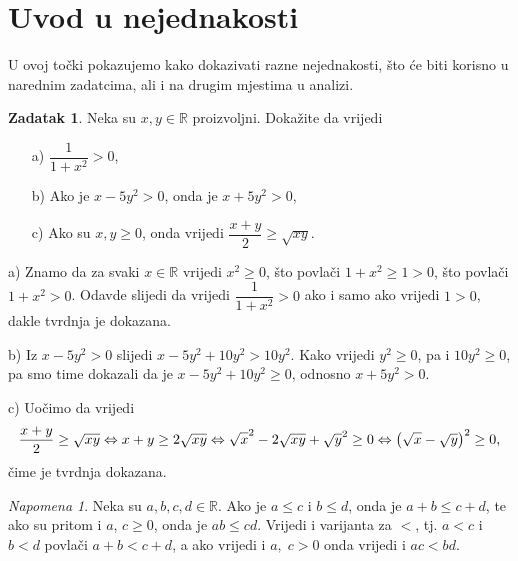 \documentclass{book}
\let\originalleft\left
\let\originalright\right
\renewcommand{\left}{\mathopen{}\mathclose\bgroup\originalleft}
\renewcommand{\right}{\aftergroup\egroup\originalright}
\renewenvironment{proof}{%
    \vspace{-\parskip}\begin{oldproof}%
    }{%
    \end{oldproof}%
}
\theoremstyle{definition}
\theoremstyle{definition}
\newtheorem{exercise}{Zadatak}
\theoremstyle{remark}
\newtheorem{remark}{Napomena}
\begin{document}
\section{Uvod u nejednakosti}
U ovoj točki pokazujemo kako dokazivati razne nejednakosti, što će biti korisno u narednim zadatcima, ali i na drugim mjestima u analizi.
\begin{exercise}
\label{25}
Neka su $x, y\in \mathbb{R}$ proizvoljni. Dokažite da vrijedi
\begin{itemize}
\item[a)] $\dfrac{1}{1+x^2}>0$,
\item[b)] Ako je $x-5y^2>0$, onda je $x+5y^2>0$,
\item[c)] Ako su $x, y\geq 0$, onda vrijedi $\dfrac{x+y}{2}\geq \sqrt{xy}$.
\end{itemize}
\end{exercise}
\begin{proof}[Rješenje]
a) Znamo da za svaki $x\in \mathbb{R}$ vrijedi $x^2\geq 0$, što povlači $1+x^2\geq 1>0$, što povlači $1+x^2>0$. Odavde slijedi da vrijedi $\dfrac{1}{1+x^2}>0$ ako i samo ako vrijedi $1>0$, dakle tvrdnja je dokazana.

b) Iz $x-5y^2>0$ slijedi $x-5y^2+10y^2>10y^2$. Kako vrijedi $y^2\geq 0$, pa i $10y^2\geq 0$, pa smo time dokazali da je $x-5y^2+10y^2\geq 0$, odnosno $x+5y^2>0$.

c) Uočimo da vrijedi
$$\dfrac{x+y}{2}\geq \sqrt{xy}\Leftrightarrow x+y\geq 2\sqrt{xy}\Leftrightarrow \sqrt{x}^2-2\sqrt{xy}+\sqrt{y}^2\geq 0\Leftrightarrow \left(\sqrt{x}-\sqrt{y}\right)^2\geq 0,$$
čime je tvrdnja dokazana.
\end{proof}
\begin{remark}
\label{10}
Neka su $a, b, c, d\in \mathbb{R}$. Ako je $a\leq c$ i $b\leq d$, onda je $a+b\leq c+d$, te ako su pritom i $a$, $c\geq 0$, onda je $ab\leq cd$. Vrijedi i varijanta za $<$, tj. $a<c$ i $b<d$ povlači $a+b<c+d$, a ako vrijedi i $a,\;c> 0$ onda vrijedi i $ac<bd$.
\end{remark}
\end{document}
